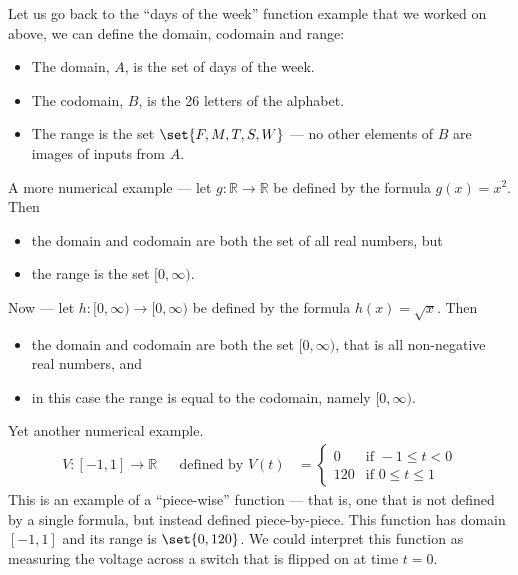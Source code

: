 \begin{eg}\label{eg_0_4_1}
Let us go back to the ``days of the week'' function example that we
worked on above, we can define the domain, codomain and range:
\begin{itemize}
 \item The domain, $A$, is the set of days of the week.
\item The codomain, $B$, is the 26 letters of the alphabet.
\item The range is the set $\set{F,M,T,S,W}$ --- no other elements of $B$ are
images of inputs from $A$.
\end{itemize}
\end{eg}
\begin{eg}\label{eg_0_4_2}
A more numerical example --- let $g: \mathbb{R} \to \mathbb{R}$ be defined
by the formula $g(x) = x^2$. Then
\begin{itemize}
 \item the domain and codomain are both the set of all real numbers, but
 \item the range is the set $[0, \infty)$.
\end{itemize}

Now --- let $h:[0,\infty) \to [0,\infty)$ be defined by the formula $h(x) =
\sqrt{x}$. Then
\begin{itemize}
 \item the domain and codomain are both the set $[0,\infty)$, that is all
non-negative real numbers, and
 \item in this case the range is equal to the codomain, namely $[0, \infty)$.
\end{itemize}
\end{eg}
\begin{eg}
\label{eg piecewise}
Yet another numerical example.
\begin{align*}
  V:[-1,1] \to \mathbb{R} && \text{defined by }
  V(t) &= \begin{cases}
          0 & \text{if } -1 \leq t < 0 \\
	  120 & \text{if } 0 \leq t \leq 1
          \end{cases}
\end{align*}
  This is an example of a ``piece-wise'' function --- that is, one that is not
defined by a single formula, but instead defined piece-by-piece. This function
has domain $[-1,1]$ and its range is $\set{0,120}$. We could interpret this
function as measuring the voltage across a switch that is flipped on at time $t=0$.
\end{eg}

